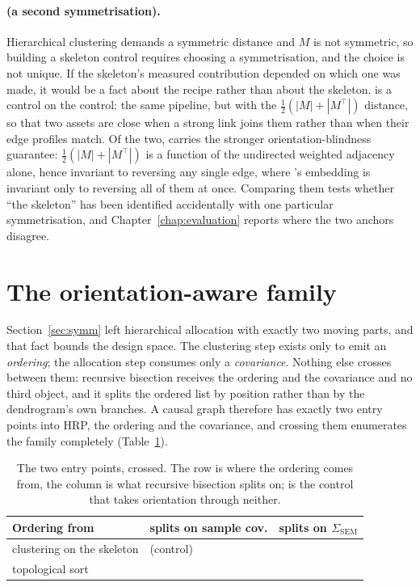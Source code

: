 \paragraph{\skelalt{} (a second symmetrisation).} Hierarchical clustering
demands
a symmetric distance and $M$ is not symmetric, so building a skeleton
control
requires choosing a symmetrisation, and the choice is not unique. If
the skeleton's measured contribution depended on which one was made, it
would be a fact about the
recipe rather than about the skeleton. \skelalt{} is a control on the
control: the
same pipeline, but with the $\tfrac{1}{2}(|M|+|M^\top|)$ distance, so that
two
assets are close when a strong link joins them rather than when their
edge profiles match. Of the two, \skelalt{} carries the stronger
orientation-blindness guarantee: $\tfrac{1}{2}(|M|+|M^\top|)$ is a
function of the undirected weighted adjacency alone, hence invariant to
reversing any single edge, where \skelsamp{}'s embedding is invariant
only to reversing all of them at once. Comparing them
tests whether ``the skeleton'' has been
identified accidentally with one particular symmetrisation, and
Chapter~\ref{chap:evaluation} reports where the two anchors disagree.

\section{The orientation-aware family}
\label{sec:d-family}

Section~\ref{sec:symm} left hierarchical allocation with exactly two moving
parts, and that fact bounds the design space. The clustering step exists only
to emit an \emph{ordering}; the allocation step consumes only a
\emph{covariance}. Nothing else crosses between them: recursive bisection
receives the ordering and the covariance and no third object, and it splits
the ordered list by position rather than by the dendrogram's own branches. A
causal graph therefore has exactly two entry points into HRP, the ordering
and the covariance, and crossing them
enumerates the family completely (Table~\ref{tab:crossing}).

\begin{table}[h]
  \centering
  \caption{The two entry points, crossed. The row is where the ordering
    comes from,
    the column is what recursive bisection splits on; \skelsamp{} is the
    control that takes orientation through neither.}
  \label{tab:crossing}
  \begin{tabular}{l l l}
    \toprule
    Ordering from & splits on sample cov. & splits on $\Sigma_{\mathrm{SEM}}$ \\
    \midrule
    clustering on the skeleton & \skelsamp{} (control) & \skelsem{} \\
    topological sort           & \orientsamp{}           & \orientsem{} \\
    \bottomrule
  \end{tabular}
\end{table}


